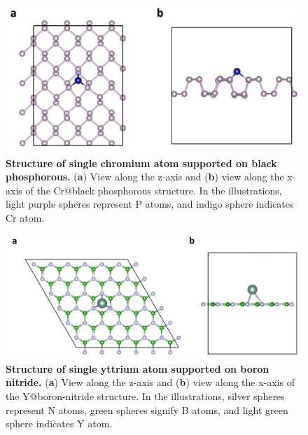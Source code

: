 \documentclass[a4paper, 12pt]{article}
\begin{document}
\begin{figure}[htbp]
  \centering
  \includegraphics[width=\textwidth]{supp_fig5_Cr-BP.png}
  \caption{\textbf{Structure of single chromium atom supported on black phosphorous.}
  (\textbf{a}) View along the z-axis and (\textbf{b}) view along the x-axis
  of the Cr@black phosphorous structure.
  In the illustrations, light purple spheres represent P atoms, and indigo sphere
  indicates Cr atom.}
  \label{supp_fig5:Cr-BP}
\end{figure}

\begin{figure}[htbp]
  \centering
  \includegraphics[width=\textwidth]{supp_fig6_Y-BN.png}
  \caption{\textbf{Structure of single yttrium atom supported on boron nitride.}
  (\textbf{a}) View along the z-axis and (\textbf{b}) view along the x-axis
  of the Y@boron-nitride structure.
  In the illustrations, silver spheres represent N atoms, green spheres
  signify B atoms, and light green sphere indicates Y atom.}
  \label{supp_fig6:Y-BN}
\end{figure}
\end{document}
